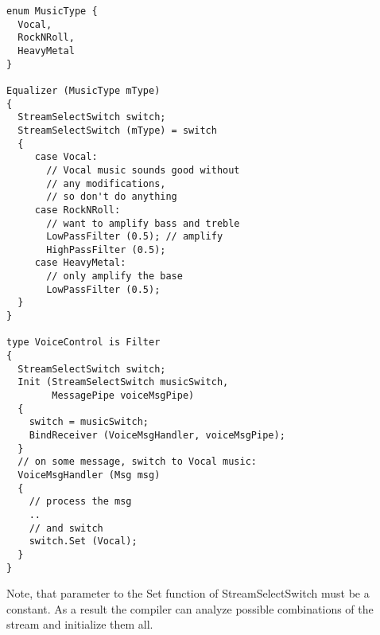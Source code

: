 \documentclass[twocolumn, draft]{article}
\begin{document}
\begin{verbatim}
enum MusicType {
  Vocal,
  RockNRoll,
  HeavyMetal
}

Equalizer (MusicType mType)
{
  StreamSelectSwitch switch;
  StreamSelectSwitch (mType) = switch
  {
     case Vocal:
       // Vocal music sounds good without 
       // any modifications,
       // so don't do anything
     case RockNRoll:
       // want to amplify bass and treble
       LowPassFilter (0.5); // amplify
       HighPassFilter (0.5);
     case HeavyMetal:
       // only amplify the base
       LowPassFilter (0.5);
  }
}

type VoiceControl is Filter
{
  StreamSelectSwitch switch;
  Init (StreamSelectSwitch musicSwitch, 
        MessagePipe voiceMsgPipe)
  {
    switch = musicSwitch;
    BindReceiver (VoiceMsgHandler, voiceMsgPipe);
  }
  // on some message, switch to Vocal music:
  VoiceMsgHandler (Msg msg)
  {
    // process the msg
    ..
    // and switch
    switch.Set (Vocal);
  }
}
\end{verbatim}

Note, that parameter to the Set function of StreamSelectSwitch must be
a constant.  As a result the compiler can analyze possible combinations
of the stream and initialize them all.
\end{document}
